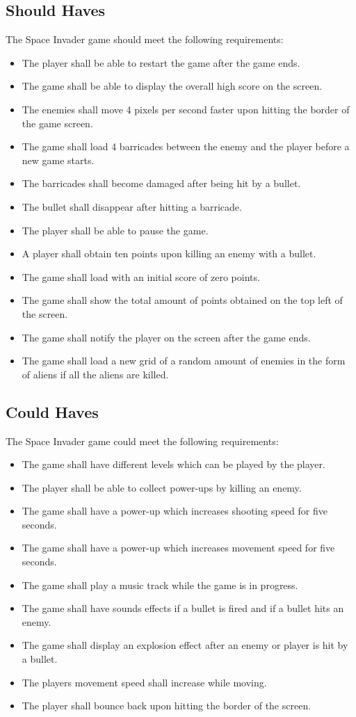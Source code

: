 \subsection{Should Haves}
The Space Invader game should meet the following requirements:
\begin{itemize}
	\item The player shall be able to restart the game after the game ends.
	\item The game shall be able to display the overall high score on the screen.
	\item The enemies shall move 4 pixels per second faster upon hitting the border of the game screen.
	\item The game shall load 4 barricades between the enemy and the player before a new game starts.
	\item The barricades shall become damaged after being hit by a bullet.
	\item The bullet shall disappear after hitting a barricade.
	\item The player shall be able to pause the game.
	\item A player shall obtain ten points upon killing an enemy with a bullet.
	\item The game shall load with an initial score of zero points.
	\item The game shall show the total amount of points obtained on the top left of the screen.	
	\item The game shall notify the player on the screen after the game ends.	
	\item The game shall load a new grid of a  random amount of enemies in the form of aliens if all the aliens are killed.
\end{itemize}

\subsection{Could Haves}
The Space Invader game could meet the following requirements:
\begin{itemize}
	\item The game shall have different levels which can be played by the player.
	\item The player shall be able to collect power-ups by killing an enemy.
	\item The game shall have a power-up which increases shooting speed for five seconds.
	\item The game shall have a power-up which increases movement speed for five seconds.
	\item The game shall play a music track while the game is in progress.
	\item The game shall have sounds effects if a bullet is fired and if a bullet hits an enemy.
	\item The game shall display an explosion effect after an enemy or player is hit by a bullet.
	\item The players movement speed shall increase while moving.
	\item The player shall bounce back upon hitting the border of the screen.
\end{itemize}

